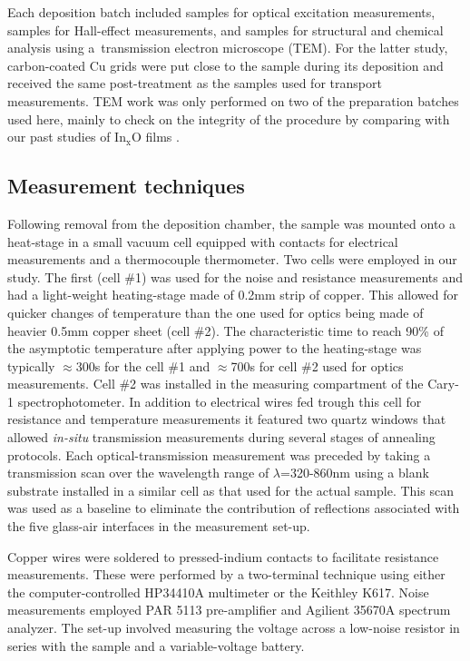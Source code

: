 \documentclass
[preprint,showpacs,byrevtex,10pt,twocolumn,tightenlines,prl,letterpaper]{revtex4}%
\begin{document}
Each deposition batch included samples for optical excitation measurements,
samples for Hall-effect measurements, and samples for structural and chemical
analysis using a\ transmission electron microscope (TEM). For the latter
study, carbon-coated Cu grids were put close to the sample during its
deposition and received the same post-treatment as the samples used for
transport measurements. TEM work was only performed on two of the preparation
batches used here, mainly to check on the integrity of the procedure by
comparing with our past studies of In$_{\text{x}}$O films \cite{14,15,16}.

\subsection{Measurement techniques}

Following removal from the deposition chamber, the sample was mounted onto a
heat-stage in a small vacuum cell equipped with contacts for electrical
measurements and a thermocouple thermometer. Two cells were employed in our
study. The first (cell \#1) was used for the noise and resistance measurements
and had a light-weight heating-stage made of 0.2mm strip of copper. This
allowed for quicker changes of temperature than the one used for optics being
made of heavier 0.5mm copper sheet (cell \#2). The characteristic time to
reach 90\% of the asymptotic temperature after applying power to the
heating-stage was typically $\approx$300s for the cell \#1 and $\approx$700s
for cell \#2 used for optics measurements. Cell \#2 was installed in the
measuring compartment of the Cary-1 spectrophotometer. In addition to
electrical wires fed trough this cell for resistance and temperature
measurements it featured two quartz windows that allowed \textit{in-situ}
transmission measurements during several stages of annealing protocols. Each
optical-transmission measurement was preceded by taking a transmission scan
over the wavelength range of $\lambda$=320-860nm using a blank substrate
installed in a similar cell as that used for the actual sample. This scan was
used as a baseline to eliminate the contribution of reflections associated
with the five glass-air interfaces in the measurement set-up.

Copper wires were soldered to pressed-indium contacts to facilitate resistance
measurements. These were performed by a two-terminal technique using either
the computer-controlled HP34410A multimeter or the Keithley K617. Noise
measurements employed PAR 5113 pre-amplifier and Agilient 35670A spectrum
analyzer. The set-up involved measuring the voltage across a low-noise
resistor in series with the sample and a variable-voltage battery.
\end{document}
